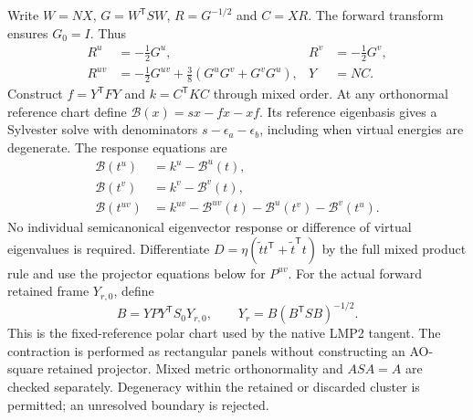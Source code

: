 \documentclass[11pt]{article}
\begin{document}
Write $W=NX$, $G=W^{\mathsf T}SW$, $R=G^{-1/2}$ and $C=XR$.
The forward transform ensures $G_0=I$. Thus
\begin{align}
 R^u&=-\tfrac12G^u,&R^v&=-\tfrac12G^v,\\
 R^{uv}&=-\tfrac12G^{uv}+\tfrac38(G^uG^v+G^vG^u),&Y&=NC.
\end{align}
Construct $f=Y^{\mathsf T}FY$ and $k=C^{\mathsf T}KC$ through mixed
order. At any orthonormal reference chart define
$\mathcal B(x)=s x-fx-xf$. Its reference eigenbasis gives a Sylvester
solve with denominators $s-\epsilon_a-\epsilon_b$, including when
virtual energies are degenerate. The response equations are
\begin{align}
 \mathcal B(t^u)&=k^u-\mathcal B^u(t),\\
 \mathcal B(t^v)&=k^v-\mathcal B^v(t),\\
 \mathcal B(t^{uv})&=k^{uv}-\mathcal B^{uv}(t)
                  -\mathcal B^u(t^v)-\mathcal B^v(t^u).
\end{align}
No individual semicanonical eigenvector response or difference of
virtual eigenvalues is required. Differentiate
$D=\eta(\tilde t t^{\mathsf T}+\tilde t^{\mathsf T}t)$ by the full
mixed product rule and use the projector equations below for $P^{uv}$.
For the actual forward retained frame $Y_{r,0}$, define
\begin{equation}
 B=YPY^{\mathsf T}S_0Y_{r,0},\qquad
 Y_r=B(B^{\mathsf T}SB)^{-1/2}.
\end{equation}
This is the fixed-reference polar chart used by the native LMP2 tangent.
The contraction is performed as rectangular panels without constructing
an AO-square retained projector. Mixed metric orthonormality and
$ASA=A$ are checked separately. Degeneracy within the retained or
discarded cluster is permitted; an unresolved boundary is rejected.
\end{document}
